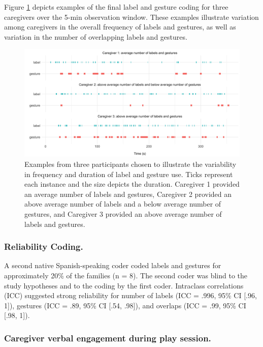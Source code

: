\documentclass[
  man,floatsintext]{apa6}
\begin{document}
Figure \ref{fig:fig1} depicts examples of the final label and gesture coding for three caregivers over the 5-min observation window. These examples illustrate variation among caregivers in the overall frequency of labels and gestures, as well as variation in the number of overlapping labels and gestures.

\begin{figure}
\includegraphics[width=1\linewidth]{../stats/figures/fig.durations} \caption{Examples from three participants chosen to illustrate the variability in frequency and duration of label and gesture use.  Ticks represent each instance and the size depicts the duration.  Caregiver 1 provided an average number of labels and gestures, Caregiver 2 provided an above average number of labels and a below average number of gestures, and Caregiver 3 provided an above average number of labels and gestures.}\label{fig:fig1}
\end{figure}

\hypertarget{reliability-coding.}{%
\subsubsection{Reliability Coding.}\label{reliability-coding.}}

A second native Spanish-speaking coder coded labels and gestures for approximately 20\% of the families (n = 8). The second coder was blind to the study hypotheses and to the coding by the first coder. Intraclass correlations (ICC) suggested strong reliability for number of labels (ICC = .996, 95\% CI {[}.96, 1{]}), gestures (ICC = .89, 95\% CI {[}.54, .98{]}), and overlaps (ICC = .99, 95\% CI {[}.98, 1{]}).

\hypertarget{caregiver-verbal-engagement-during-play-session.}{%
\subsubsection{Caregiver verbal engagement during play session.}\label{caregiver-verbal-engagement-during-play-session.}}
\end{document}
